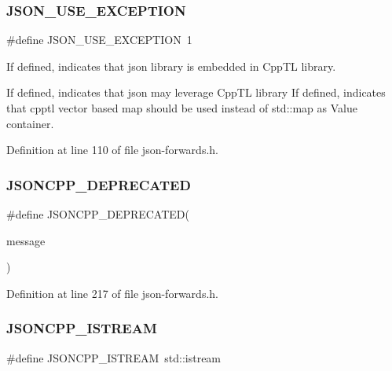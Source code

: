 \subsubsection{\texorpdfstring{J\+S\+O\+N\+\_\+\+U\+S\+E\+\_\+\+E\+X\+C\+E\+P\+T\+I\+ON}{JSON\_USE\_EXCEPTION}}
{\footnotesize\ttfamily \#define J\+S\+O\+N\+\_\+\+U\+S\+E\+\_\+\+E\+X\+C\+E\+P\+T\+I\+ON~1}



If defined, indicates that json library is embedded in Cpp\+TL library. 

If defined, indicates that json may leverage Cpp\+TL library If defined, indicates that cpptl vector based map should be used instead of std\+::map as Value container. 

Definition at line 110 of file json-\/forwards.\+h.

\hypertarget{json-forwards_8h_a6933a4321aa03c8a29016669073f1af6}{}\label{json-forwards_8h_a6933a4321aa03c8a29016669073f1af6} 
\subsubsection{\texorpdfstring{J\+S\+O\+N\+C\+P\+P\+\_\+\+D\+E\+P\+R\+E\+C\+A\+T\+ED}{JSONCPP\_DEPRECATED}}
{\footnotesize\ttfamily \#define J\+S\+O\+N\+C\+P\+P\+\_\+\+D\+E\+P\+R\+E\+C\+A\+T\+ED(\begin{DoxyParamCaption}\item[{}]{message }\end{DoxyParamCaption})}



Definition at line 217 of file json-\/forwards.\+h.

\hypertarget{json-forwards_8h_a15f2f70b2ce0a2abd0f8112393dbc4de}{}\label{json-forwards_8h_a15f2f70b2ce0a2abd0f8112393dbc4de} 
\subsubsection{\texorpdfstring{J\+S\+O\+N\+C\+P\+P\+\_\+\+I\+S\+T\+R\+E\+AM}{JSONCPP\_ISTREAM}}
{\footnotesize\ttfamily \#define J\+S\+O\+N\+C\+P\+P\+\_\+\+I\+S\+T\+R\+E\+AM~std\+::istream}



